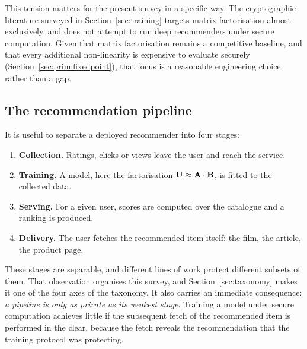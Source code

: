 This tension matters for the present survey in a specific way. The cryptographic literature
surveyed in Section~\ref{sec:training} targets matrix factorisation almost exclusively, and does
not attempt to run deep recommenders under secure computation. Given that matrix factorisation
remains a competitive baseline, and that every additional non-linearity is expensive to evaluate
securely (Section~\ref{sec:prim:fixedpoint}), that focus is a reasonable engineering choice rather
than a gap.

\subsection{The recommendation pipeline}
\label{sec:background:pipeline}

It is useful to separate a deployed recommender into four stages:

\begin{enumerate}
  \item \textbf{Collection.} Ratings, clicks or views leave the user and reach the service.
  \item \textbf{Training.} A model, here the factorisation
        $\mathbf{U} \approx \mathbf{A} \cdot \mathbf{B}$, is fitted to the collected data.
  \item \textbf{Serving.} For a given user, scores are computed over the catalogue and a ranking
        is produced.
  \item \textbf{Delivery.} The user fetches the recommended item itself: the film, the article,
        the product page.
\end{enumerate}

These stages are separable, and different lines of work protect different subsets of them. That
observation organises this survey, and Section~\ref{sec:taxonomy} makes it one of the four axes of
the taxonomy. It also carries an immediate consequence: \emph{a pipeline is only as private as its
weakest stage}. Training a model under secure computation achieves little if the subsequent fetch
of the recommended item is performed in the clear, because the fetch reveals the recommendation
that the training protocol was protecting.

